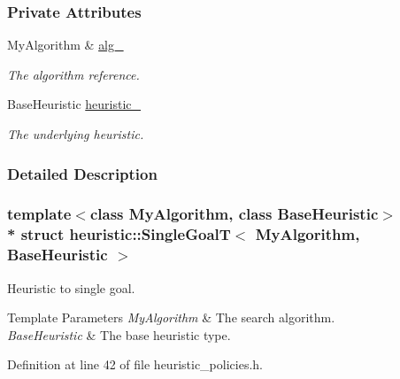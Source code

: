 \subsubsection*{Private Attributes}
\begin{DoxyCompactItemize}
\item 
My\+Algorithm \& \hyperlink{structheuristic_1_1SingleGoalT_a3059bc03513310b4194e9f3d79be3580}{alg\+\_\+}\hypertarget{structheuristic_1_1SingleGoalT_a3059bc03513310b4194e9f3d79be3580}{}\label{structheuristic_1_1SingleGoalT_a3059bc03513310b4194e9f3d79be3580}

\begin{DoxyCompactList}\small\item\em The algorithm reference. \end{DoxyCompactList}\item 
Base\+Heuristic \hyperlink{structheuristic_1_1SingleGoalT_a9b683565d0c2cdd566cd90ec281b4715}{heuristic\+\_\+}\hypertarget{structheuristic_1_1SingleGoalT_a9b683565d0c2cdd566cd90ec281b4715}{}\label{structheuristic_1_1SingleGoalT_a9b683565d0c2cdd566cd90ec281b4715}

\begin{DoxyCompactList}\small\item\em The underlying heuristic. \end{DoxyCompactList}\end{DoxyCompactItemize}


\subsubsection{Detailed Description}
\subsubsection*{template$<$class My\+Algorithm, class Base\+Heuristic$>$\\*
struct heuristic\+::\+Single\+Goal\+T$<$ My\+Algorithm, Base\+Heuristic $>$}

Heuristic to single goal. 


\begin{DoxyTemplParams}{Template Parameters}
{\em My\+Algorithm} & The search algorithm. \\
\hline
{\em Base\+Heuristic} & The base heuristic type. \\
\hline
\end{DoxyTemplParams}


Definition at line 42 of file heuristic\+\_\+policies.\+h.




